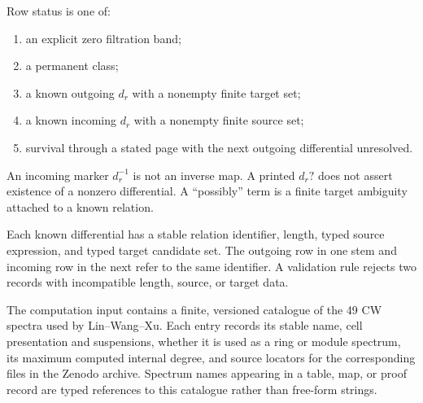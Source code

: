 \begin{definition}
  \label{def:appendix-row-status}
  \notready
  Row status is one of:
  \begin{enumerate}
    \item an explicit zero filtration band;
    \item a permanent class;
    \item a known outgoing $d_r$ with a nonempty finite target set;
    \item a known incoming $d_r$ with a nonempty finite source set;
    \item survival through a stated page with the next outgoing differential
      unresolved.
  \end{enumerate}
  An incoming marker $d_r^{-1}$ is not an inverse map.  A printed $d_r?$ does
  not assert existence of a nonzero differential.  A ``possibly'' term is a
  finite target ambiguity attached to a known relation.
\end{definition}

\begin{definition}
  \label{def:differential-relation-id}
  \notready
  Each known differential has a stable relation identifier, length, typed
  source expression, and typed target candidate set.  The outgoing row in one
  stem and incoming row in the next refer to the same identifier.  A validation
  rule rejects two records with incompatible length, source, or target data.
\end{definition}

\begin{definition}
  \label{def:lin-spectrum-catalogue}
  \notready
  The computation input contains a finite, versioned catalogue of the 49 CW
  spectra used by Lin--Wang--Xu.  Each entry records its stable name, cell
  presentation and suspensions, whether it is used as a ring or module
  spectrum, its maximum computed internal degree, and source locators for the
  corresponding files in the Zenodo archive.  Spectrum names appearing in a
  table, map, or proof record are typed references to this catalogue rather
  than free-form strings.
\end{definition}

